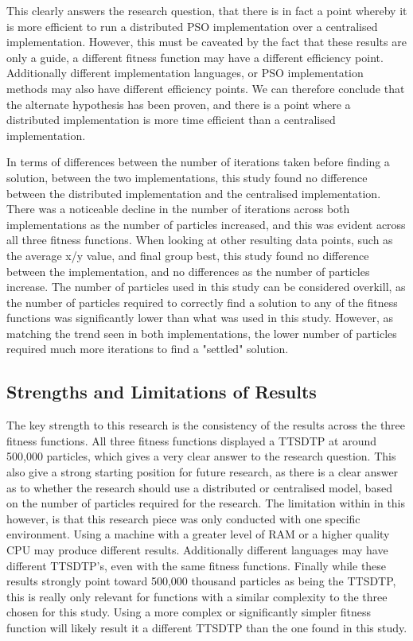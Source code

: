 \documentclass[oneside,12pt]{book}
\begin{document}
This clearly answers the research question, that there is in fact a point whereby it is more efficient to run a distributed PSO implementation over a centralised implementation. However, this must be caveated by the fact that these results are only a guide, a different fitness function may have a different efficiency point. Additionally different implementation languages, or PSO implementation methods may also have different efficiency points. 
We can therefore conclude that the alternate hypothesis has been proven, and there is a point where a distributed implementation is more time efficient than a centralised implementation. 

In terms of differences between the number of iterations taken before finding a solution, between the two implementations, this study found no difference between the distributed implementation and the centralised implementation. There was a noticeable decline in the number of iterations across both implementations as the number of particles increased, and this was evident across all three fitness functions. When looking at other resulting data points, such as the average x/y value, and final group best, this study found no difference between the implementation, and no differences as the number of particles increase. The number of particles used in this study can be considered overkill, as the number of particles required to correctly find a solution to any of the fitness functions was significantly lower than what was used in this study. However, as matching the trend seen in both implementations, the lower number of particles required much more iterations to find a "settled" solution. 

\subsection{Strengths and Limitations of Results}
The key strength to this research is the consistency of the results across the three fitness functions. All three fitness functions displayed a TTSDTP at around 500,000 particles, which gives a very clear answer to the research question. This also give a strong starting position for future research, as there is a clear answer as to whether the research should use a distributed or centralised model, based on the number of particles required for the research. The limitation within in this however, is that this research piece was only conducted with one specific environment. Using a machine with a greater level of RAM or a higher quality CPU may produce different results. Additionally different languages may have different TTSDTP's, even with the same fitness functions. Finally while these results strongly point toward 500,000 thousand particles as being the TTSDTP, this is really only relevant for functions with a similar complexity to the three chosen for this study. Using a more complex or significantly simpler fitness function will likely result it a different TTSDTP than the one found in this study. 
\end{document}
